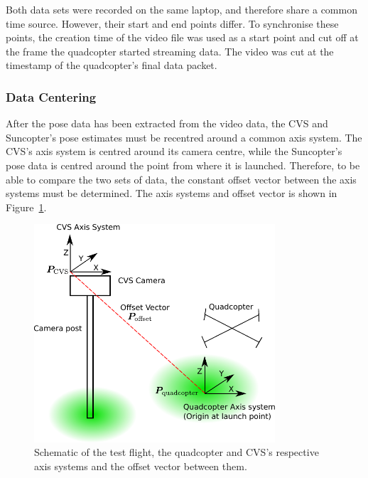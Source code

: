 Both data sets were recorded on the same laptop, and therefore share a common time source. However, their start and end points differ. To synchronise these points, the creation time of the video file was used as a start point and cut off at the frame the quadcopter started streaming data. The video was cut at the timestamp of the quadcopter's final data packet. 

\subsubsection{Data Centering}
\label{sec:chap5-data-centring}

After the pose data has been extracted from the video data, the CVS and Suncopter's pose estimates must be recentred around a common axis system. The CVS's axis system is centred around its camera centre, while the Suncopter's pose data is centred around the point from where it is launched. Therefore, to be able to compare the two sets of data, the constant offset vector between the axis systems must be determined. The axis systems and offset vector is shown in Figure~\ref{fig:chap5-flight-test-schem}.

\begin{figure}
  \centering
  \includegraphics[width=0.8\textwidth]{figures/chapter5/test_flight_schem}
  \caption[Shematic of the test flight layout.]{Schematic of the test flight, the quadcopter and CVS's respective axis systems and the offset vector between them.}
\label{fig:chap5-flight-test-schem}
\end{figure}

